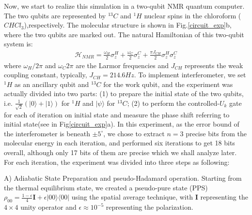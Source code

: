 \documentclass[twocolumn,showpacs,twoside,10pt,superscriptaddress,prl]{revtex4}
\begin{document}
Now, we start to realize this simulation in a two-qubit NMR quantum
computer. The two qubits are represented by $^{13}C$ and $^{1}H$
nuclear spins in the chloroform ($CHCl_{3}$),respectively. The
molecular structure is shown in Fig.\ref{circuit_exp}b, where the
two qubits are marked out. The natural Hamiltonian of this two-qubit
system is:
\begin{eqnarray}\label{HamCHF}
\mathcal{H}_{\mathit{NMR}}=\frac{\omega_{H}}{2}\sigma_{z}^H+\frac{\omega_{C}}{2}\sigma_{z}^{C}+\frac{\pi
J_{CH}}{2}\sigma_{z}^{H}\sigma_{z}^{C}
\end{eqnarray}
where $\omega_{H}/2\pi$ and $\omega_{C}2\pi$ are the Larmor
frequencies and $J_{CH}$ represents the weak coupling constant,
typically, $J_{CH}=214.6Hz$. To implement interferometer, we set
$^{1}H$ as an ancillary qubit and $^{13}C$ for the work qubit, and
the experiment was actually divided into two parts: (1) to prepare
 the initial state of the two qubits, i.e.
$\frac{1}{\sqrt{2}}(|0\rangle+|1\rangle)$ for $^{1}H$ and
$|\psi\rangle$ for $^{13}C$; (2) to perform the controlled-$U_k$
gate for each of iteration on initial state and measure the phase
shift referring to initial state(see in Fig\ref{circuit_exp}a). In
this experiment, as the error bound of the interferometer is beneath
$\pm5^\circ$, we chose to extract $n=3$ precise bits from the
molecular energy in each iteration, and performed six iterations to
get 18 bits overall, although only 17 bits of them are precise which
we shall analyze later. For each iteration, the experiment was
divided into three steps as following:

A) Adiabatic State Preparation and pseudo-Hadamard operation.
  Starting from the thermal equilibrium state, we created a pseudo-pure state (PPS) $\rho_{00} =\frac{1 -
\epsilon}{4} \mathbf{I}+ \epsilon|00\rangle \langle 00|$ using the
spatial average technique\cite{spatial}, with $\mathbf{I}$
representing the $4 \times 4$ unity operator and $\epsilon \approx
10^{-5}$  representing the polarization.
\end{document}
